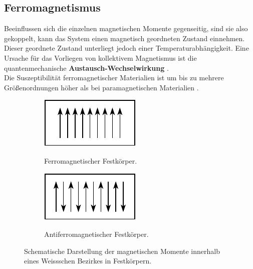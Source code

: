 \documentclass[page,pdftex,12pt,a4paper,twoside,openright]{scrbook}
\begin{document}
\subsection{Ferromagnetismus \label{sec-ferro}}
\label{sec:org79a2a0c}

Beeinflussen sich die einzelnen magnetischen Momente gegenseitig, sind sie also gekoppelt, kann das System einen magnetisch geordneten Zustand einnehmen. Dieser geordnete Zustand unterliegt jedoch einer Temperaturabhängigkeit. Eine Ursache für das Vorliegen von kollektivem Magnetismus ist die quantenmechanische \textbf{Austausch-Wechselwirkung} \cite{kassing_bergmann_2005}.\\

Die Suszeptibilität ferromagnetischer Materialien ist um bis zu mehrere Größenordnungen höher als bei paramagnetischen Materialien \cite{demtroder_experimentalphysik_2017}.\\

\begin{figure}[h]
\centering
\begin{subfigure}[b]{0.3\textwidth}
\caption{Ferromagnetischer Festkörper.}
\includegraphics[width=\textwidth]{./img/ferro.pdf}
\label{fig-ferro}
\end{subfigure}
\quad
\begin{subfigure}[b]{0.3\textwidth}
\caption{Antiferromagnetischer Festkörper.}
\includegraphics[width=\textwidth]{./img/antiferro.pdf}
\label{fig-antiferro}
\end{subfigure}
\caption{Schematische Darstellung der magnetischen Momente innerhalb eines Weissschen Bezirkes in Festkörpern.}
\end{figure}
\end{document}
